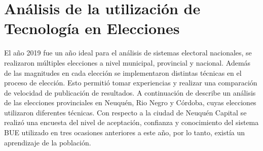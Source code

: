 \section{Análisis de la utilización de Tecnología en Elecciones}
El año 2019 fue un año ideal para el análisis de sistemas electoral nacionales, se realizaron múltiples elecciones a nivel municipal, provincial y nacional. Además de las magnitudes en cada elección se implementaron distintas técnicas en el proceso de elección. Esto permitió tomar experiencias y realizar una comparación de velocidad de publicación de resultados. A continuación de describe un análisis de las elecciones provinciales en Neuquén, Rio Negro y Córdoba, cuyas elecciones utilizaron diferentes técnicas. Con respecto a la ciudad de Neuquén Capital se realizó una encuesta del nivel de aceptación, confianza y conocimiento del sistema BUE utilizado en tres ocasiones anteriores a este año, por lo tanto, existía un aprendizaje de la población.



